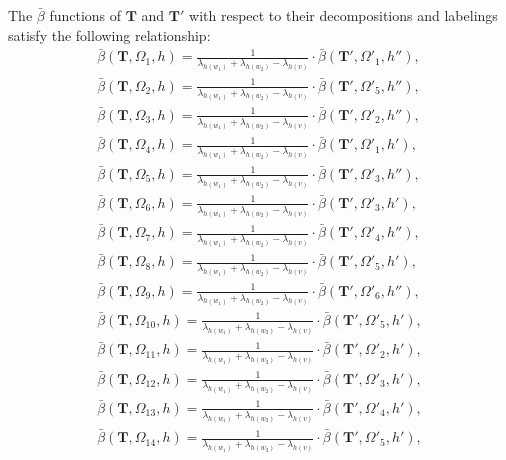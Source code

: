 \documentclass[superscriptaddress,onecolumn,nofootinbib,longbibliography,a4paper,accepted=2026-09-29]{quantumarticle}
\theoremstyle{plain}
\theoremstyle{definition}
\numberwithin{thm}{section}
\numberwithin{assumption}{section}
\numberwithin{lemma}{section}
\numberwithin{prop}{section}
\numberwithin{cor}{section}
\numberwithin{definition}{section}
\numberwithin{rmk}{section}
\numberwithin{equation}{section}
\newcommand{\mbf}{\mathbf{T}}
\begin{document}
\begin{itemize}
The $\bar{\beta}$ functions of $\mbf$ and $\mbf'$ with respect to their decompositions and labelings satisfy the following relationship:
\begin{align}
\bar{\beta}(\mbf, \Omega_1, h)
=\frac{1}{\lambda_{h(w_1)}+\lambda_{h(w_2)}-\lambda_{h(v)}} \cdot
\bar{\beta}(\mbf', \Omega'_1, h''),\\
\bar{\beta}(\mbf, \Omega_2, h)
=\frac{1}{\lambda_{h(w_1)}+\lambda_{h(w_2)}-\lambda_{h(v)}} \cdot
\bar{\beta}(\mbf', \Omega'_5, h''),\\
\bar{\beta}(\mbf, \Omega_3, h)
=\frac{1}{\lambda_{h(w_1)}+\lambda_{h(w_2)}-\lambda_{h(v)}} \cdot
\bar{\beta}(\mbf', \Omega'_2, h''),\\
\bar{\beta}(\mbf, \Omega_4, h)
=\frac{1}{\lambda_{h(w_1)}+\lambda_{h(w_2)}-\lambda_{h(v)}} \cdot
\bar{\beta}(\mbf', \Omega'_1, h'),\\
\bar{\beta}(\mbf, \Omega_5, h)
=\frac{1}{\lambda_{h(w_1)}+\lambda_{h(w_2)}-\lambda_{h(v)}} \cdot
\bar{\beta}(\mbf', \Omega'_3, h''),\\
\bar{\beta}(\mbf, \Omega_6, h)
=\frac{1}{\lambda_{h(w_1)}+\lambda_{h(w_2)}-\lambda_{h(v)}} \cdot
\bar{\beta}(\mbf', \Omega'_3, h'),\\
\bar{\beta}(\mbf, \Omega_7, h)
=\frac{1}{\lambda_{h(w_1)}+\lambda_{h(w_2)}-\lambda_{h(v)}} \cdot
\bar{\beta}(\mbf', \Omega'_4, h''),\\
\bar{\beta}(\mbf, \Omega_8, h)
=\frac{1}{\lambda_{h(w_1)}+\lambda_{h(w_2)}-\lambda_{h(v)}} \cdot
\bar{\beta}(\mbf', \Omega'_5, h'),\\
\bar{\beta}(\mbf, \Omega_9, h)
=\frac{1}{\lambda_{h(w_1)}+\lambda_{h(w_2)}-\lambda_{h(v)}} \cdot
\bar{\beta}(\mbf', \Omega'_6, h''),\\
\bar{\beta}(\mbf, \Omega_{10}, h)
=\frac{1}{\lambda_{h(w_1)}+\lambda_{h(w_2)}-\lambda_{h(v)}} \cdot
\bar{\beta}(\mbf', \Omega'_{5}, h'),\\
\bar{\beta}(\mbf, \Omega_{11}, h)
=\frac{1}{\lambda_{h(w_1)}+\lambda_{h(w_2)}-\lambda_{h(v)}} \cdot
\bar{\beta}(\mbf', \Omega'_2, h'),\\
\bar{\beta}(\mbf, \Omega_{12}, h)
=\frac{1}{\lambda_{h(w_1)}+\lambda_{h(w_2)}-\lambda_{h(v)}} \cdot
\bar{\beta}(\mbf', \Omega'_3, h'),\\
\bar{\beta}(\mbf, \Omega_{13}, h)
=\frac{1}{\lambda_{h(w_1)}+\lambda_{h(w_2)}-\lambda_{h(v)}} \cdot
\bar{\beta}(\mbf', \Omega'_4, h'),\\
\bar{\beta}(\mbf, \Omega_{14}, h)
=\frac{1}{\lambda_{h(w_1)}+\lambda_{h(w_2)}-\lambda_{h(v)}} \cdot
\bar{\beta}(\mbf', \Omega'_5, h'),\\

\end{align}
\end{itemize}
\end{document}

